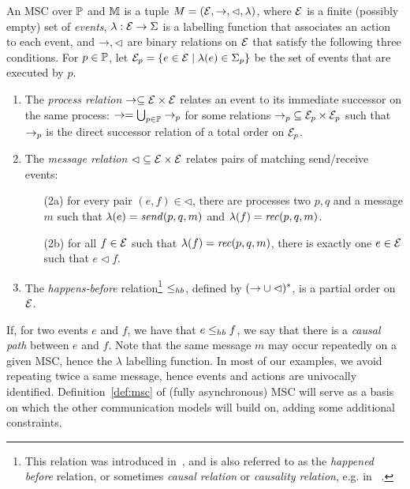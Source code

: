 \begin{definition}[MSC]\label{def:msc}
	An {MSC}  over $\mathbb{P}$ and $\mathbb{M}$ is a tuple $M = (\mathcal{E},\to,\lhd,\lambda)$, where 
	$\mathcal{E}$ is a finite (possibly empty) set of \emph{events}, $\lambda: \mathcal{E} \to \Sigma$ is a labelling 
	function that associates an action to each event,
	and $\to,\lhd$ are binary relations on $\mathcal{E}$ that satisfy the following three conditions.
	For $p \in \mathbb{P}$, let $\mathcal{E}_p = \{e \in \mathcal{E} \mid \lambda(e) \in \Sigma_{p}\}$ be 
	the set of events that are executed by $p$. 
	\begin{enumerate}
		\item The \emph{process relation} $\to\subseteq \mathcal{E} \times \mathcal{E}$ 
		relates an event to its immediate successor on
		the same process:
		$\to=\bigcup_{p \in \mathbb{P}} \to_p$ for some 
		relations ${\to_p} \subseteq \mathcal{E}_p \times \mathcal{E}_p$ such that $\to_p$ is 
		the direct successor relation of a total order on $\mathcal{E}_p$.  
		\item The \emph{message relation} ${\lhd} \subseteq \mathcal{E} \times \mathcal{E}$ 
		relates pairs of matching send/receive events: 	
		\begin{enumerate}%
			\item[(2a)] for every pair $(e,f) \in {\lhd}$, there are processes two $p,q$ and a message $m$ such that $\lambda(e) = \mathit{send}(p, q, m)$ and $\lambda(f) = \mathit{rec}(p, q, m)$.
			\item[(2b)] for all $f \in \mathcal{E}$ such that $\lambda(f) = \mathit{rec}(p, q, m)$, %
			there is exactly one $e \in \mathcal{E}$ such that $e \lhd f$.
		\end{enumerate}
		\item The \emph{happens-before} relation\footnote{This relation was introduced in~\cite{Lamport78}, and is also referred to as the \emph{happened before} relation,
		or sometimes \emph{causal relation} or \emph{causality relation}, e.g. in~\cite{DBLP:journals/dc/Charron-BostMT96,DBLP:conf/cav/BouajjaniEJQ18} .} ${\leq_{hb}}$, defined by $({\to} \cup {\lhd})^\ast$,
		is a partial order on $\mathcal{E}$.
	\end{enumerate}
\end{definition}

 If, for two events $e$ and $f$, we have that $e \leq_{hb} f$, we   say that there is a \emph{causal path} between $e$ and $f$.
Note that the same message $m$ may occur repeatedly on a given MSC,
hence the $\lambda$ labelling function. In most of our 
examples, we avoid repeating twice a same message, hence events and actions are univocally identified.
Definition~\ref{def:msc} of (fully asynchronous) MSC will serve as a basis on which the other communication models will build on, adding some additional constraints.

